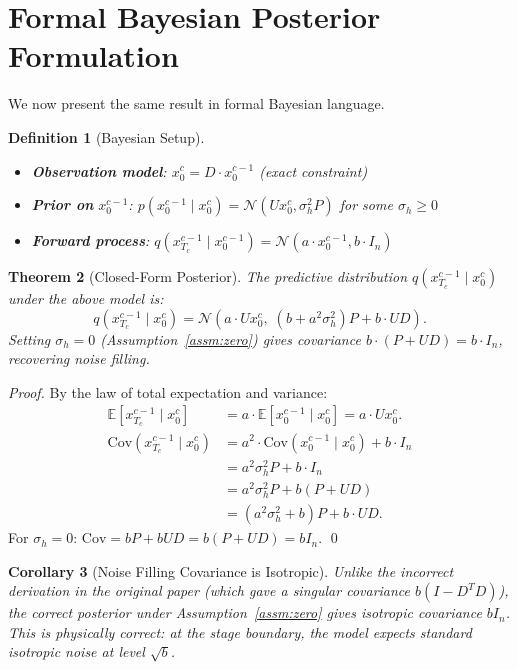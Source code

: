 \documentclass[11pt]{article}
\newtheorem{theorem}{Theorem}[section]
\newtheorem{corollary}[theorem]{Corollary}
\newtheorem{definition}[theorem]{Definition}
\theoremstyle{remark}
\begin{document}
\section{Formal Bayesian Posterior Formulation}

We now present the same result in formal Bayesian language.

\begin{definition}[Bayesian Setup]
\begin{itemize}
    \item \textbf{Observation model}: $x_0^c = D \cdot x_0^{c-1}$ (exact constraint)
    \item \textbf{Prior on} $x_0^{c-1}$: $p(x_0^{c-1} \mid x_0^c) = \mathcal{N}(Ux_0^c, \sigma_h^2 P)$ for some $\sigma_h \geq 0$
    \item \textbf{Forward process}: $q(x_{T_c}^{c-1} \mid x_0^{c-1}) = \mathcal{N}(a \cdot x_0^{c-1}, b \cdot I_n)$
\end{itemize}
\end{definition}

\begin{theorem}[Closed-Form Posterior]\label{thm:bayes}
The predictive distribution $q(x_{T_c}^{c-1} \mid x_0^c)$ under the above model is:
\begin{equation}
    q(x_{T_c}^{c-1} \mid x_0^c) = \mathcal{N}\!\left(a \cdot Ux_0^c,\; (b + a^2\sigma_h^2)P + b \cdot UD\right).
\end{equation}
Setting $\sigma_h = 0$ (Assumption~\ref{assm:zero}) gives covariance $b \cdot (P + UD) = b \cdot I_n$, recovering noise filling.
\end{theorem}

\begin{proof}
By the law of total expectation and variance:
\begin{align}
    \mathbb{E}[x_{T_c}^{c-1} \mid x_0^c] &= a \cdot \mathbb{E}[x_0^{c-1} \mid x_0^c] = a \cdot Ux_0^c. \\
    \mathrm{Cov}(x_{T_c}^{c-1} \mid x_0^c) &= a^2 \cdot \mathrm{Cov}(x_0^{c-1} \mid x_0^c) + b \cdot I_n \\
    &= a^2 \sigma_h^2 P + b \cdot I_n \\
    &= a^2\sigma_h^2 P + b(P + UD) \\
    &= (a^2\sigma_h^2 + b)P + b \cdot UD.
\end{align}
For $\sigma_h = 0$: $\mathrm{Cov} = bP + bUD = b(P + UD) = bI_n$. \qed
\end{proof}

\begin{corollary}[Noise Filling Covariance is Isotropic]
Unlike the incorrect derivation in the original paper (which gave a singular covariance $b(I - D^TD)$), the correct posterior under Assumption~\ref{assm:zero} gives isotropic covariance $bI_n$. This is physically correct: at the stage boundary, the model expects standard isotropic noise at level $\sqrt{b}$.
\end{corollary}
\end{document}
